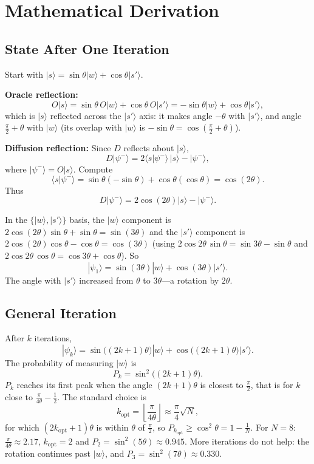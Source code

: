 \documentclass[a4paper,11pt]{article}
\providecommand{\ket}[1]{|{#1}\rangle}
\providecommand{\braket}[2]{\langle{#1}|{#2}\rangle}
\begin{document}
\section*{Mathematical Derivation}

\subsection*{State After One Iteration}

Start with $\ket{s} = \sin\theta\ket{w} + \cos\theta\ket{s'}$.

\textbf{Oracle reflection:}
\[
O\ket{s}
= \sin\theta\,O\ket{w} + \cos\theta\,O\ket{s'}
= -\sin\theta\ket{w} + \cos\theta\ket{s'},
\]
which is $\ket{s}$ reflected across the $\ket{s'}$ axis: it makes angle $-\theta$ with $\ket{s'}$, and angle $\frac{\pi}{2}+\theta$ with $\ket{w}$ (its overlap with $\ket{w}$ is $-\sin\theta = \cos(\frac{\pi}{2}+\theta)$).

\textbf{Diffusion reflection:}
Since $D$ reflects about $\ket{s}$,
\[
D\ket{\psi^-} = 2\braket{s}{\psi^-}\,\ket{s} - \ket{\psi^-},
\]
where $\ket{\psi^-} = O\ket{s}$. Compute
\[
\braket{s}{\psi^-} = \sin\theta(-\sin\theta) + \cos\theta(\cos\theta)
             = \cos(2\theta).
\]
Thus
\[
D\ket{\psi^-}
= 2\cos(2\theta)\ket{s} - \ket{\psi^-}.
\]

In the $\{\ket{w},\ket{s'}\}$ basis, the $\ket{w}$ component is $2\cos(2\theta)\sin\theta + \sin\theta = \sin(3\theta)$ and the $\ket{s'}$ component is $2\cos(2\theta)\cos\theta - \cos\theta = \cos(3\theta)$ (using $2\cos2\theta\,\sin\theta = \sin3\theta - \sin\theta$ and $2\cos2\theta\,\cos\theta = \cos3\theta + \cos\theta$). So
\[
\ket{\psi_1} = \sin(3\theta)\ket{w} + \cos(3\theta)\ket{s'}.
\]
The angle with $\ket{s'}$ increased from $\theta$ to $3\theta$---a rotation by $2\theta$.

\subsection*{General Iteration}

After $k$ iterations,
\[
\ket{\psi_k} = \sin\bigl((2k+1)\theta\bigr)\ket{w}
             + \cos\bigl((2k+1)\theta\bigr)\ket{s'}.
\]
The probability of measuring $\ket{w}$ is
\[
P_k = \sin^2\bigl((2k+1)\theta\bigr).
\]
$P_k$ reaches its first peak when the angle $(2k+1)\theta$ is closest to $\frac{\pi}{2}$, that is for $k$ close to $\frac{\pi}{4\theta}-\frac12$. The standard choice is
\[
k_{\text{opt}} = \left\lfloor\frac{\pi}{4\theta}\right\rfloor \approx \frac{\pi}{4}\sqrt{N},
\]
for which $(2k_{\text{opt}}+1)\theta$ is within $\theta$ of $\frac{\pi}{2}$, so $P_{k_{\text{opt}}} \ge \cos^2\theta = 1-\frac{1}{N}$.
For $N=8$: $\frac{\pi}{4\theta}\approx 2.17$, $k_{\text{opt}}=2$ and $P_2=\sin^2(5\theta)\approx 0.945$.
More iterations do not help: the rotation continues past $\ket{w}$, and $P_3=\sin^2(7\theta)\approx 0.330$.
\end{document}
